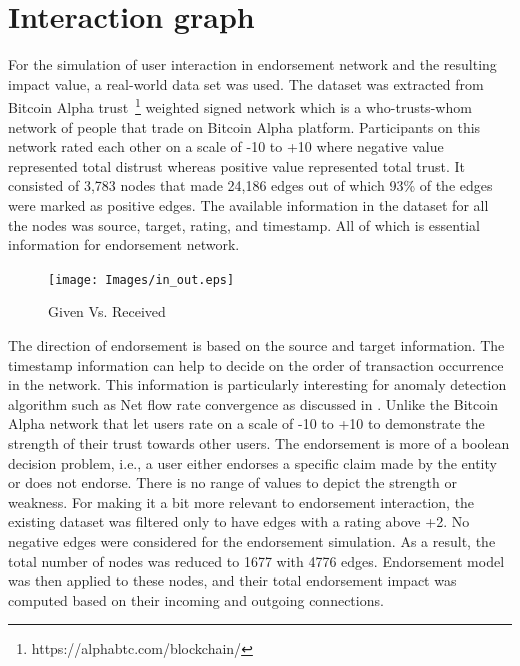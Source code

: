 \section{Interaction graph} \label{sec:interaction}
For the simulation of user interaction in endorsement network and the resulting
impact value, a real-world data set was used. The dataset was extracted from
Bitcoin Alpha trust~\footnote{https://alphabtc.com/blockchain/} weighted signed
network which is a who-trusts-whom network of people that trade on Bitcoin
Alpha platform. Participants on this network rated each other on a scale of -10
to +10 where negative value represented total distrust whereas positive value
represented total trust. It consisted of 3,783 nodes that made 24,186 edges out
of which 93\% of the edges were marked as positive edges\cite{kumar2016edge}.
The available information in the dataset for all the nodes was source, target,
rating, and timestamp. All of which is essential information for endorsement
network.
\begin{figure}
	\texttt{[image: Images/in\_out.eps]} 
	\caption{Given Vs. Received} 
	\label{inOut}
\end{figure}
The direction of endorsement is based on the source and target information.
The timestamp information can help to decide on the order of transaction
occurrence in the network. This information is particularly interesting for
anomaly detection algorithm such as Net flow rate convergence as discussed in
\cite{buechler2015decentralized}.  Unlike the Bitcoin Alpha network that let
users rate on a scale of -10 to +10 to demonstrate the strength of their trust
towards other users. The endorsement is more of a boolean decision problem,
i.e., a user either endorses a specific claim made by the entity or does not
endorse. There is no range of values to depict the strength or weakness. For
making it a bit more relevant to endorsement interaction, the existing dataset
was filtered only to have edges with a rating above +2. No negative edges were
considered for the endorsement simulation.  As a result, the total number of
nodes was reduced to 1677 with 4776 edges. Endorsement model was then applied
to these nodes, and their total endorsement impact was computed based on their
incoming and outgoing connections. 


